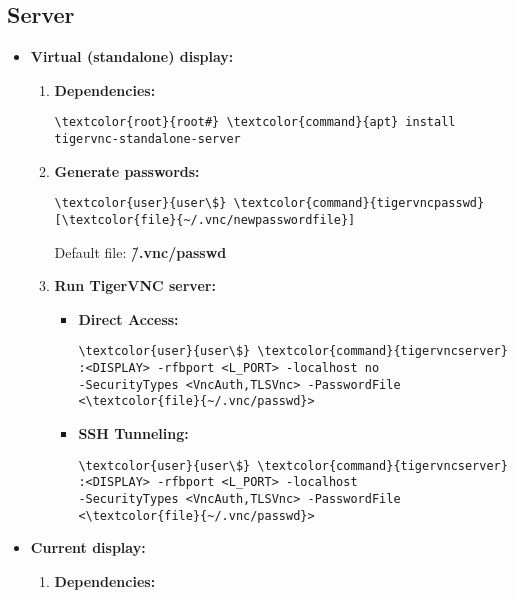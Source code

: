 \documentclass[10pt, a4paper, onecolumn, openany]{book} %
\begin{document}
\subsection{Server}
\begin{itemize}
    \item \textbf{Virtual (standalone) display:}
    \begin{enumerate}
        \item \textbf{Dependencies:}
\begin{Verbatim}[commandchars=\\\{\}]
\textcolor{root}{root#} \textcolor{command}{apt} install tigervnc-standalone-server
\end{Verbatim}
        \item \textbf{Generate passwords:}
\begin{Verbatim}[commandchars=\\\{\}]
\textcolor{user}{user\$} \textcolor{command}{tigervncpasswd} [\textcolor{file}{~/.vnc/newpasswordfile}]
\end{Verbatim}
Default file: \textbf{\textcolor{file}{\~/.vnc/passwd}}
        \item \textbf{Run TigerVNC server:}
        \begin{itemize}
            \item \textbf{Direct Access:}
\begin{Verbatim}[commandchars=\\\{\}]
\textcolor{user}{user\$} \textcolor{command}{tigervncserver} :<DISPLAY> -rfbport <L_PORT> -localhost no
-SecurityTypes <VncAuth,TLSVnc> -PasswordFile <\textcolor{file}{~/.vnc/passwd}>
\end{Verbatim}            
            \item \textbf{SSH Tunneling:}
\begin{Verbatim}[commandchars=\\\{\}]
\textcolor{user}{user\$} \textcolor{command}{tigervncserver} :<DISPLAY> -rfbport <L_PORT> -localhost
-SecurityTypes <VncAuth,TLSVnc> -PasswordFile <\textcolor{file}{~/.vnc/passwd}>
\end{Verbatim}
        \end{itemize}
    \end{enumerate}
    \item \textbf{Current display:}
    \begin{enumerate}
        \item \textbf{Dependencies:}
\begin{Verbatim}[commandchars=\\\{\}]

\end{Verbatim}
\end{enumerate}
\end{itemize}
\end{document}
